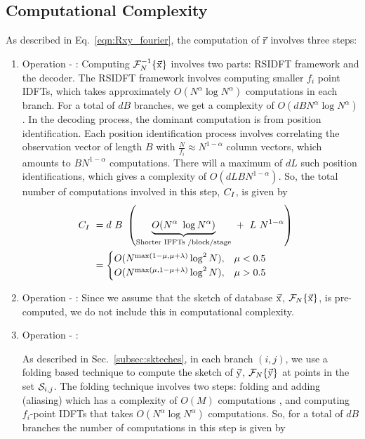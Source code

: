 \subsection{\bf Computational Complexity}
As described in Eq.~\ref{eqn:Rxy_fourier}, the computation of $\vec{\mathrm{r}}$ involves three steps:
\begin{enumerate} 
	\item  Operation - :
	 Computing $\mathcal{F}_{N}^{-1}\{ \vec{\mathrm{x}} \}$ involves two parts: RSIDFT framework and the decoder. The RSIDFT framework involves computing smaller $f_i$ point IDFTs, which takes approximately $O(N^{\alpha} \log N^{\alpha})$ computations in each branch. For a total of $dB$ branches, we get a complexity of $O(dB N^{\alpha} \log N^{\alpha})$. In the decoding process, the dominant computation is from position identification. Each position identification process involves correlating the observation vector of length $B$ with $\frac{N}{f_i} \approx N^{1-\alpha}$ column vectors, which amounts to $B N^{1-\alpha}$ computations. There will a maximum of $dL$ such position identifications, which gives a complexity of $O(dLBN^{1-\alpha} )$.   So, the total number of computations involved in this step, $C_{\RNum{1}}$, is given by
	\begin{align*}
	C_{\RNum{1}} \ &=  {d ~ B} \ \left (
	\underset{\text{Shorter IFFTs /block/stage} }{\underbrace{ O(N^{\alpha} \ \log N^{\alpha})}}  ~ + ~ L~N^{1-\alpha} \right )& \\
	\vspace{2pt}
	\ & =	
	\begin{cases}
	O(N^{\max(1-\mu, \mu + \lambda) } \log^2 N ), &  	 \mu < 0.5\\
	O(N^{\max(\mu, 1- \mu + \lambda )} \log^2 N ), &  	 \mu > 0.5
	\end{cases}
	\end{align*}
	
	
	\item  Operation - :
	Since we assume that the sketch of database $\vec{\mathrm{x}}$, $\mathcal{F}_{N}\{\vec{\mathrm{x}}\}$, is pre-computed, we do not include this in computational complexity.
	
	\item  Operation - :
	
	As described in Sec.~\ref{subsec:skteches}, in each branch $(i,j)$, we use a folding based technique to compute the sketch of $\vec{\mathrm{y}}$, $\mathcal{F}_{N}\{\vec{\mathrm{y}}\}$ at points in the set $\mathcal{S}_{i,j}$. The folding technique involves two steps: folding and adding (aliasing) which has a complexity of $O(M)$ computations , and computing $f_i$-point IDFTs that takes $O(N^\alpha \log N^{\alpha})$ computations. So, for a total of $dB$ branches the number of computations in this step is given by
	

\end{enumerate}
